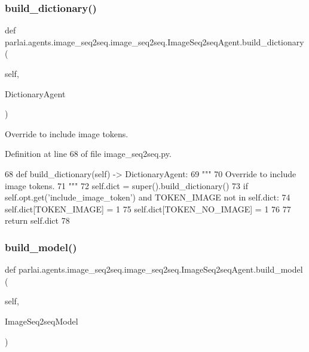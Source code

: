 \subsubsection{\texorpdfstring{build\+\_\+dictionary()}{build\_dictionary()}}
{\footnotesize\ttfamily def parlai.\+agents.\+image\+\_\+seq2seq.\+image\+\_\+seq2seq.\+Image\+Seq2seq\+Agent.\+build\+\_\+dictionary (\begin{DoxyParamCaption}\item[{}]{self,  }\item[{}]{Dictionary\+Agent }\end{DoxyParamCaption})}

\begin{DoxyVerb}Override to include image tokens.
\end{DoxyVerb}
 

Definition at line 68 of file image\+\_\+seq2seq.\+py.


\begin{DoxyCode}
68     \textcolor{keyword}{def }build\_dictionary(self) -> DictionaryAgent:
69         \textcolor{stringliteral}{"""}
70 \textcolor{stringliteral}{        Override to include image tokens.}
71 \textcolor{stringliteral}{        """}
72         self.dict = super().build\_dictionary()
73         \textcolor{keywordflow}{if} self.opt.get(\textcolor{stringliteral}{'include\_image\_token'}) \textcolor{keywordflow}{and} TOKEN\_IMAGE \textcolor{keywordflow}{not} \textcolor{keywordflow}{in} self.dict:
74             self.dict[TOKEN\_IMAGE] = 1
75             self.dict[TOKEN\_NO\_IMAGE] = 1
76 
77         \textcolor{keywordflow}{return} self.dict
78 
\end{DoxyCode}
\mbox{\label{classparlai_1_1agents_1_1image__seq2seq_1_1image__seq2seq_1_1ImageSeq2seqAgent_a57153a1ef2941b32bad39d72e5a05c7d}} 
\subsubsection{\texorpdfstring{build\+\_\+model()}{build\_model()}}
{\footnotesize\ttfamily def parlai.\+agents.\+image\+\_\+seq2seq.\+image\+\_\+seq2seq.\+Image\+Seq2seq\+Agent.\+build\+\_\+model (\begin{DoxyParamCaption}\item[{}]{self,  }\item[{}]{Image\+Seq2seq\+Model }\end{DoxyParamCaption})}

